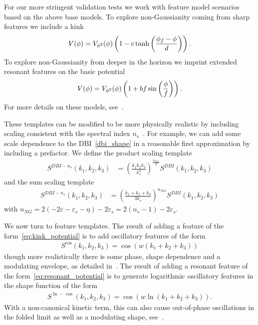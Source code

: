 For our more stringent validation tests we work with feature model scenarios
based on the above base models.
To explore non-Gaussianity coming from sharp features we include
a kink~\cite{Adams_step}
\begin{align}\label{eq:kink_potential}
    V(\phi) = V_{\phi^2}(\phi)\left(1-c\tanh\left(\frac{\phi_f-\phi}{d}\right)\right).
\end{align}
To explore non-Gaussianity from deeper in the horizon we imprint
extended resonant features on the basic potential
\begin{align}\label{eq:resonant_potential}
    V(\phi) = V_{\phi^2}(\phi)\left(1+bf\sin\left(\frac{\phi}{f}\right)\right).
\end{align}
For more details on these models, see~\cite{chen_easther_lim_2}.


These templates can be modified to be more physically realistic by including
scaling consistent with the spectral index $n_s$~\cite{Planck_NG_2015}.
For example, we can add some scale dependence to the DBI~\eqref{dbi_shape}
in a reasonable first approximation by including a prefactor.
We define the product scaling template
\begin{align}\label{dbi_prod_shape}
    S^{DBI-n_s}(k_1,k_2,k_3) &= {\left(\frac{k_1k_2k_3}{k^3_\star}\right)}^{\frac{n_{NG}}{3}}S^{DBI}(k_1,k_2,k_3)
\end{align}
and the sum scaling template
\begin{align}\label{dbi_sum_shape}
    S^{DBI-n_s}(k_1,k_2,k_3) &= {\left(\frac{k_1+k_2+k_3}{3k_\star}\right)}^{n_{NG}}S^{DBI}(k_1,k_2,k_3)
\end{align}
with $n_{NG}=2(-2\varepsilon-\varepsilon_s-\eta)-2\varepsilon_s=2(n_s-1)-2\varepsilon_s$.

We now turn to feature templates.
The result of adding a feature of the form~\eqref{eq:kink_potential}
is to add oscillatory features of the form
\begin{align}\label{cos_shape}
    S^{\cos}(k_1,k_2,k_3) = \cos(w(k_1+k_2+k_3))
\end{align}
though more realistically there is some phase, shape dependence and a modulating envelope,
as detailed in~\cite{adshead}.
The result of adding a resonant feature of the form~\eqref{eq:resonant_potential}
is to generate logarithmic oscillatory features in the shape function of the form
\begin{align}\label{ln_cos_shape}
    S^{\ln-\cos}(k_1,k_2,k_3) = \cos(w\ln(k_1+k_2+k_3)).
\end{align}
With a non-canonical kinetic term, this can also
cause out-of-phase oscillations in the folded limit as well as a modulating shape,
see~\cite{chen_folded_resonant}.


